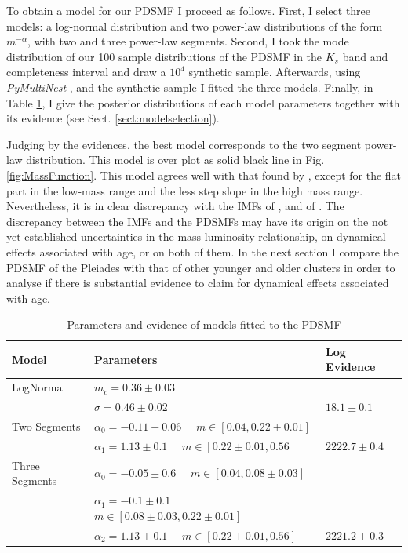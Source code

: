 To obtain a  model for our PDSMF I proceed as follows. First, I select three models: a log-normal distribution and two power-law distributions of the form $m^{-\alpha}$, with two and three power-law segments. Second, I took the mode distribution of our 100 sample distributions of the PDSMF in the $K_s$ band and completeness interval and draw a $10^4$ synthetic sample. Afterwards, using \emph{PyMultiNest} \citep{Buchner2014}, and the synthetic sample I fitted the three models. Finally, in Table \ref{tab:fitPDSMF}, I give the posterior distributions of each model parameters together with its evidence (see Sect. \ref{sect:modelselection}).

Judging by the evidences, the best model corresponds to the two segment power-law distribution. This model is over plot as solid black line in Fig. \ref{fig:MassFunction}. This model agrees well with that found by \citet{Bouy2015}, except for the flat part in the low-mass range and the less step slope in the high mass range. Nevertheless, it is in clear discrepancy with the IMFs of \citet{Chabrier2005},  \cite[$m_c=0.25_{-0.016}^{+0.021}$ and $\sigma=0.55_{-0.01}^{+0.05}$, the uncertainties are those reported by][for single objects]{Chabrier2003} and of \citet{Thies2007}. The discrepancy between the IMFs and the PDSMFs \cite[][and ours]{Bouy2015} may have its origin on the not yet established uncertainties in the mass-luminosity relationship, on dynamical effects associated with age, or on both of them. In the next section I compare the PDSMF of the Pleiades with that of other younger and older clusters in order to analyse if there is substantial evidence to claim for dynamical effects associated with age.

\begin{table}[ht!]
\caption{Parameters and evidence of models fitted to the PDSMF}
\begin{center}
\begin{tabular}{lll}
Model&Parameters& Log Evidence\\
\hline
LogNormal&$m_c=0.36\pm0.03$&\\
                 &$\sigma=0.46\pm0.02$ & $18.1 \pm 0.1$\\
\hline
Two Segments &$\alpha_0=-0.11\pm0.06$ \ \ $m \in [0.04,0.22\pm0.01]$ & \\ 
&  $\alpha_1=1.13\pm0.1$ \ \ $m \in [0.22\pm0.01,0.56]$&$2222.7\pm0.4$\\
\hline
Three Segments &$\alpha_0=-0.05\pm0.6$ \ \ $m \in [0.04,0.08\pm0.03]$ & \\
                          &$\alpha_1=-0.1\pm0.1$ \ \ $m \in [0.08\pm0.03,0.22\pm0.01]$ & \\ 
                          &$\alpha_2=1.13\pm0.1$ \ \ $m \in [0.22\pm0.01,0.56]$&$2221.2\pm 0.3$\\
\hline
\end{tabular}
\end{center}
\label{tab:fitPDSMF}
\end{table}%

